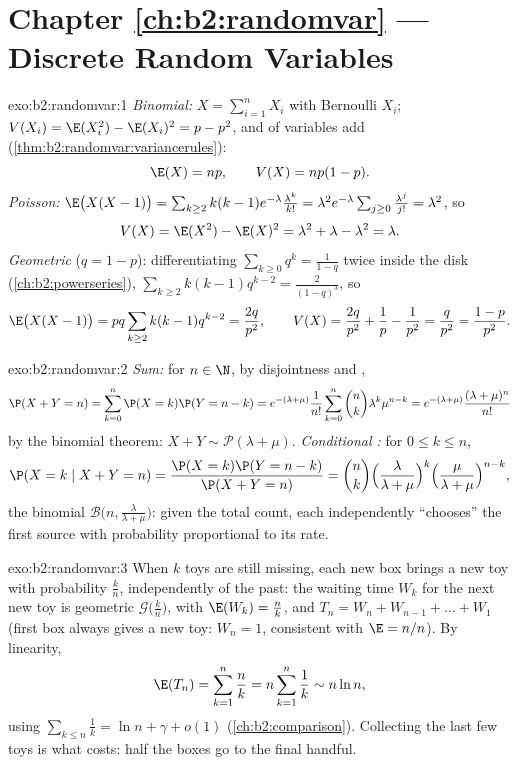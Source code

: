 \section*{Chapter \ref{ch:b2:randomvar} --- Discrete Random Variables}

\begin{solution}{exo:b2:randomvar:1}
\emph{Binomial:} $X = \sum_{i=1}^n X_i$ with  Bernoulli
$X_i$; $V(X_i) = \E(X_i^2) - \E(X_i)^2 = p - p^2$, and 
of  variables add
(\cref{thm:b2:randomvar:variancerules}):
\[
\E(X) = np, \qquad V(X) = np(1-p) .
\]
\emph{Poisson:} $\E\bigl(X(X-1)\bigr) =
\sum_{k\geq2}k(k-1)e^{-\lambda}\frac{\lambda^k}{k!} = \lambda^2
e^{-\lambda}\sum_{j\geq0}\frac{\lambda^j}{j!} = \lambda^2$, so
\[
V(X) = \E(X^2) - \E(X)^2
= \lambda^2 + \lambda - \lambda^2 = \lambda .
\]
\emph{Geometric} ($q = 1 - p$): differentiating
$\sum_{k\geq0}q^k = \frac{1}{1-q}$ twice inside the disk
(\cref{ch:b2:powerseries}), $\sum_{k\geq2}k(k-1)q^{k-2} =
\frac{2}{(1-q)^3}$, so
\[
\E\bigl(X(X-1)\bigr) = pq\sum_{k\geq2}k(k-1)q^{k-2}
= \frac{2q}{p^2},
\qquad
V(X) = \frac{2q}{p^2} + \frac1p - \frac{1}{p^2}
= \frac{q}{p^2} = \frac{1-p}{p^2} .
\]
\end{solution}

\begin{solution}{exo:b2:randomvar:2}
\emph{Sum:} for $n \in \N$, by disjointness and ,
\[
\P(X + Y = n)
= \sum_{k=0}^n \P(X = k)\P(Y = n - k)
= e^{-(\lambda + \mu)}\frac{1}{n!}
\sum_{k=0}^n \binom nk \lambda^k\mu^{n-k}
= e^{-(\lambda+\mu)}\frac{(\lambda + \mu)^n}{n!}
\]
by the binomial theorem: $X + Y \sim \mathcal{P}(\lambda + \mu)$.
\emph{Conditional :} for $0 \leq k \leq n$,
\[
\P(X = k \mid X + Y = n)
= \frac{\P(X = k)\P(Y = n - k)}{\P(X + Y = n)}
= \binom nk
\Bigl(\frac{\lambda}{\lambda+\mu}\Bigr)^{k}
\Bigl(\frac{\mu}{\lambda+\mu}\Bigr)^{n-k} ,
\]
the binomial  $\mathcal{B}\bigl(n,
\frac{\lambda}{\lambda+\mu}\bigr)$: given the total count, each
 independently ``chooses'' the first source with probability
proportional to its rate.
\end{solution}

\begin{solution}{exo:b2:randomvar:3}
When $k$ toys are still missing, each new box brings a new toy
with probability $\frac kn$, independently of the past: the
waiting time $W_k$ for the next new toy is geometric
$\mathcal{G}\bigl(\frac kn\bigr)$, with $\E(W_k) = \frac nk$, and
$T_n = W_n + W_{n-1} + \dots + W_1$ (first box always gives a new
toy: $W_n = 1$, consistent with $\E = n/n$). By linearity,
\[
\E(T_n) = \sum_{k=1}^n \frac nk = n\sum_{k=1}^n\frac1k
\sim n\ln n ,
\]
using $\sum_{k\leq n}\frac1k = \ln n + \gamma + o(1)$
(\cref{ch:b2:comparison}). Collecting the last few toys is what
costs: half the boxes go to the final handful.
\end{solution}

